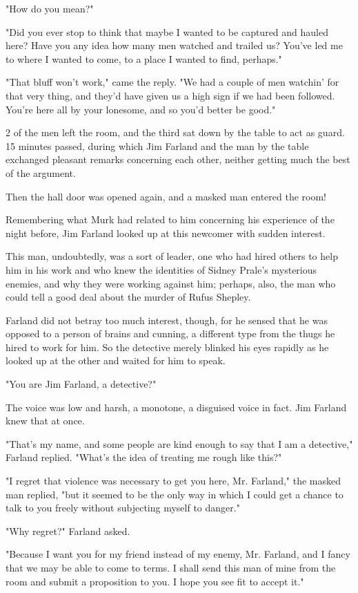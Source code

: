 \documentclass{novel}
\begin{document}
"How do you mean?"

"Did you ever stop to think that maybe I wanted to be captured and hauled here? Have you any idea how many men watched and trailed us? You've led me to where I wanted to come, to a place I wanted to find, perhaps."

"That bluff won't work," came the reply. "We had a couple of men watchin' for that very thing, and they'd have given us a high sign if we had been followed. You're here all by your lonesome, and so you'd better be good."

2 of the men left the room, and the third sat down by the table to act as guard. 15 minutes passed, during which Jim Farland and the man by the table exchanged pleasant remarks concerning each other, neither getting much the best of the argument.

Then the hall door was opened again, and a masked man entered the room!

Remembering what Murk had related to him concerning his experience of the night before, Jim Farland looked up at this newcomer with sudden interest.

This man, undoubtedly, was a sort of leader, one who had hired others to help him in his work and who knew the identities of Sidney Prale's mysterious enemies, and why they were working against him; perhaps, also, the man who could tell a good deal about the murder of Rufus Shepley.

Farland did not betray too much interest, though, for he sensed that he was opposed to a person of brains and cunning, a different type from the thugs he hired to work for him. So the detective merely blinked his eyes rapidly as he looked up at the other and waited for him to speak.

"You are Jim Farland, a detective?"

The voice was low and harsh, a monotone, a disguised voice in fact. Jim Farland knew that at once.

"That's my name, and some people are kind enough to say that I am a detective," Farland replied. "What's the idea of treating me rough like this?"

"I regret that violence was necessary to get you here, Mr. Farland," the masked man replied, "but it seemed to be the only way in which I could get a chance to talk to you freely without subjecting myself to danger."

"Why regret?" Farland asked.

"Because I want you for my friend instead of my enemy, Mr. Farland, and I fancy that we may be able to come to terms. I shall send this man of mine from the room and submit a proposition to you. I hope you see fit to accept it."
\end{document}
